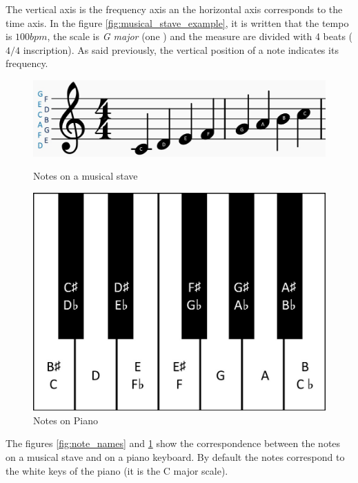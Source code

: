 \documentclass[12pt]{report}
\begin{document}
The vertical axis is the frequency axis an the horizontal axis corresponds to the time axis.
In the figure \ref{fig:musical_stave_example}, it is written that the tempo is $100 bpm$, the scale is \textit{G major} (one \musSharp) and the measure are divided with 4 beats ($4/4$ inscription).
As said previously, the vertical position of a note indicates its frequency.

\begin{figure}[H]
   \begin{minipage}{0.5\textwidth}
     \centering
     \includegraphics[width=.9\linewidth]{images/music/stave/note_names.jpg}
     \caption{Notes on a musical stave}
     \label{fig:note_names}
   \end{minipage}\hfill
   \begin{minipage}{0.5\textwidth}
     \centering
     \includegraphics[width=.9\linewidth]{images/music/piano/piano_keys.jpg}
     \caption{Notes on Piano}
     \label{fig:piano_keys}
   \end{minipage}
\end{figure}

The figures \ref{fig:note_names} and \ref{fig:piano_keys} show the correspondence between the notes on a musical stave and on a piano keyboard. By default the notes correspond to the white keys of the piano (it is the C major scale).
\end{document}
